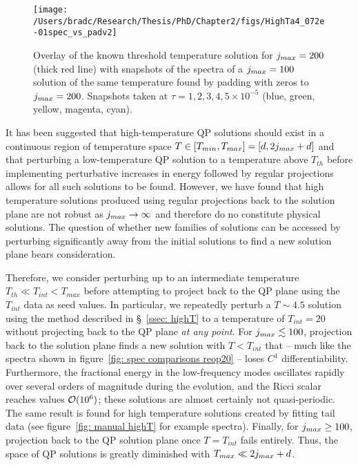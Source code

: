 \documentclass[../PhD.tex]{subfiles}
\begin{document}
\begin{figure}[h]
	\centering
	\texttt{[image: /Users/bradc/Research/Thesis/PhD/Chapter2/figs/HighTa4\_072e-01spec\_vs\_padv2]}
	\caption[Comparison between a threshold temperature solution with $j_{max} = 200$ and the evolution of a $j_{max} = 100$ threshold temperature solution that has been padded by $100$ modes]{Overlay of the known threshold temperature solution for $j_{max} = 200$ (thick red line) with snapshots of the spectra of a $j_{max} = 100$ solution of the same temperature found by padding with zeros to $j_{max} = 200$. Snapshots taken at $\tau =1, 2, 3, 4, 5 \times 10^{-5}$ (blue, green, yellow, magenta, cyan).}
	\label{fig: HighTa4_072e-01spec_vs_pad}
\end{figure}

It has been suggested that high-temperature QP solutions should exist in a continuous region of temperature space ${T \in [T_{min}, T_{max}] = [d, 2j_{max} + d]}$ and that perturbing a low-temperature QP solution to a temperature above $T_{th}$ before implementing perturbative increases in energy followed by regular projections allows for all such solutions to be found. However, we have found that high temperature solutions produced using regular projections back to the solution plane are not robust as $j_{max} \to \infty$ and therefore do no constitute physical solutions. The question of whether new families of solutions can be accessed by perturbing significantly away from the initial solutions to find a new solution plane bears consideration. 

Therefore, we consider perturbing up to an intermediate temperature $T_{th} \ll T_{int} < T_{max}$ before attempting to project back to the QP plane using the $T_{int}$ data as seed values. In particular, we repeatedly perturb a $T \sim 4.5$ solution using the method described in \S~\ref{ssec: highT} to a temperature of $T_{int} = 20$ without projecting back to the QP plane \emph{at any point}. For $j_{max} \lesssim 100$, projection back to the solution plane finds a new solution with $T < T_{int}$ that -- much like the spectra shown in figure~\ref{fig: spec comparisons reop20} -- loses $C^1$ differentiability. Furthermore, the fractional energy in the low-frequency modes oscillates rapidly over several orders of magnitude during the evolution, and the Ricci scalar reaches values $\mathcal O (10^6)$; these solutions are almost certainly not quasi-periodic. The same result is found for high temperature solutions created by fitting tail data (see figure~\ref{fig: manual highT} for example spectra). Finally, for $j_{max} \geq 100$, projection back to the QP solution plane once $T = T_{int}$ fails entirely. Thus, the space of QP solutions is greatly diminished with $T_{max} \ll 2j_{max} + d$. 
\end{document}

